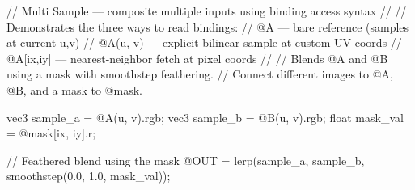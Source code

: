 // Multi Sample — composite multiple inputs using binding access syntax
//
// Demonstrates the three ways to read bindings:
//   @A        — bare reference (samples at current u,v)
//   @A(u, v)  — explicit bilinear sample at custom UV coords
//   @A[ix,iy] — nearest-neighbor fetch at pixel coords
//
// Blends @A and @B using a mask with smoothstep feathering.
// Connect different images to @A, @B, and a mask to @mask.

vec3 sample_a = @A(u, v).rgb;
vec3 sample_b = @B(u, v).rgb;
float mask_val = @mask[ix, iy].r;

// Feathered blend using the mask
@OUT = lerp(sample_a, sample_b, smoothstep(0.0, 1.0, mask_val));